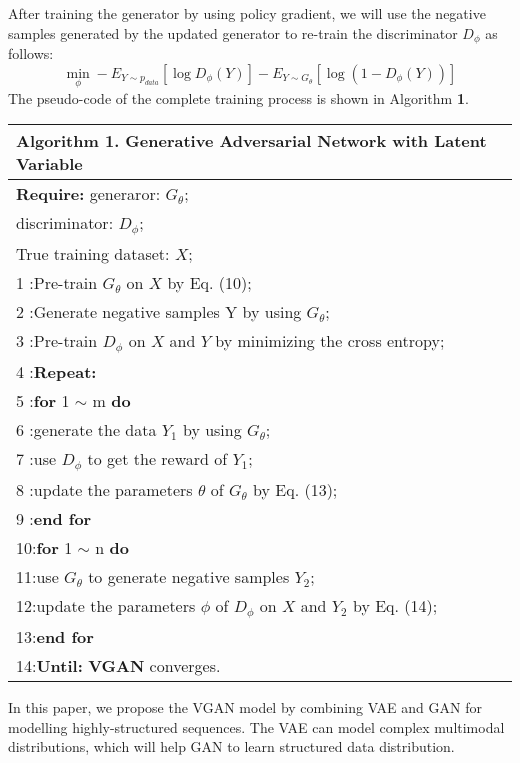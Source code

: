 \documentclass{llncs}
\begin{document}
After training the generator by using policy gradient, we will use the negative samples generated by the updated generator to re-train the discriminator $D_{\phi}$ as follows:
\begin{equation}
\min_{\phi} -E_{Y\sim p_{data}}[ \log D_{\phi}(Y)] - E_{Y\sim G_{\theta}}[ \log(1- D_{\phi}(Y))]
\label{eq:pathnode}
\end{equation}
The pseudo-code of the complete training process is shown in Algorithm \textbf{1}.
\begin{table}
\begin{tabular}{l}
\hline
\textbf{Algorithm 1.} Generative Adversarial Network with Latent Variable\\
\hline
\hline
\textbf{Require:} generaror: $G_{\theta}$; \\
\quad\quad discriminator: $D_{\phi}$; \\
\quad\quad True training dataset: $X$;\\
  1 :\quad Pre-train $G_{\theta}$ on $X$ by Eq. (10);\\
  2 :\quad Generate negative samples Y by using $G_{\theta}$;\\
  3 :\quad Pre-train $D_{\phi}$ on $X$ and $Y$ by minimizing the cross entropy;\\
  4 :\quad \textbf{Repeat:} \\
  5 :\quad\quad \textbf{for} 1 $\sim$ m \textbf{do}\\
  6 :\quad\quad\quad generate the data  $Y_{1}$ by using $G_{\theta}$;\\
  7 :\quad\quad\quad  use $D_{\phi}$ to get the reward of $Y_1$;\\
  8 :\quad\quad\quad  update the parameters $\theta$ of $G_{\theta}$ by Eq. (13); \\
  9 :\quad\quad \textbf{end for} \\
10:\quad\quad \textbf{for} 1 $\sim$ n \textbf{do}\\
11:\quad\quad\quad use $G_{\theta}$ to generate negative samples $Y_{2}$;\\
12:\quad\quad\quad update the parameters $\phi$ of $D_{\phi}$ on $X$ and  $Y_{2}$    by Eq. (14);\\
13:\quad\quad \textbf{end for} \\
14:\quad \textbf{Until:} \textbf{VGAN} converges. \\
\hline
\end{tabular}
\label{tab:AveSatis}
\end{table}


In this paper, we propose the VGAN model by combining VAE and GAN for modelling highly-structured sequences. The VAE can model complex multimodal distributions, which will help GAN to learn structured data distribution.
\end{document}
